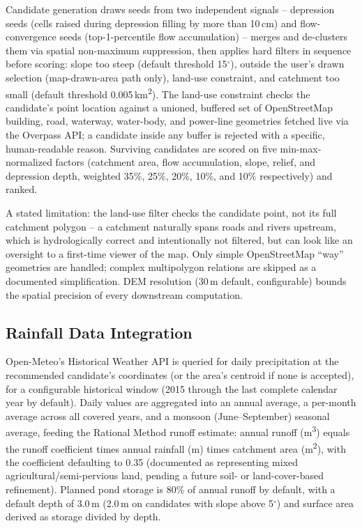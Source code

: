 \documentclass[manuscript,screen]{acmart}
\begin{document}
Candidate generation draws seeds from two independent signals --
depression seeds (cells raised during depression filling by more than
10\,cm) and flow-convergence seeds (top-1-percentile flow accumulation) --
merges and de-clusters them via spatial non-maximum suppression, then
applies hard filters in sequence before scoring: slope too steep (default
threshold 15$^\circ$), outside the user's drawn selection (map-drawn-area
path only), land-use constraint, and catchment too small (default
threshold 0.005\,km\textsuperscript{2}). The land-use constraint checks
the candidate's point location against a unioned, buffered set of
OpenStreetMap building, road, waterway, water-body, and power-line
geometries fetched live via the Overpass API; a candidate inside any
buffer is rejected with a specific, human-readable reason. Surviving
candidates are scored on five min-max-normalized factors (catchment area,
flow accumulation, slope, relief, and depression depth, weighted 35\%,
25\%, 20\%, 10\%, and 10\% respectively) and ranked.

A stated limitation: the land-use filter checks the candidate point, not
its full catchment polygon -- a catchment naturally spans roads and
rivers upstream, which is hydrologically correct and intentionally not
filtered, but can look like an oversight to a first-time viewer of the
map. Only simple OpenStreetMap ``way'' geometries are handled; complex
multipolygon relations are skipped as a documented simplification. DEM
resolution (30\,m default, configurable) bounds the spatial precision of
every downstream computation.

\subsection{Rainfall Data Integration}
Open-Meteo's Historical Weather API is queried for daily precipitation at
the recommended candidate's coordinates (or the area's centroid if none is
accepted), for a configurable historical window (2015 through the last
complete calendar year by default). Daily values are aggregated into an
annual average, a per-month average across all covered years, and a
monsoon (June--September) seasonal average, feeding the Rational Method
runoff estimate: annual runoff (m\textsuperscript{3}) equals the runoff
coefficient times annual rainfall (m) times catchment area
(m\textsuperscript{2}), with the coefficient defaulting to 0.35
(documented as representing mixed agricultural/semi-pervious land, pending
a future soil- or land-cover-based refinement). Planned pond storage is
80\% of annual runoff by default, with a default depth of 3.0\,m (2.0\,m
on candidates with slope above 5$^\circ$) and surface area derived as
storage divided by depth.
\end{document}
